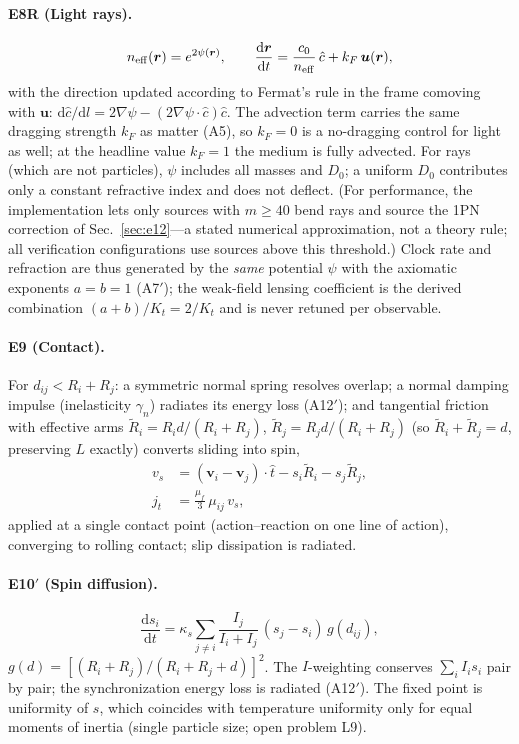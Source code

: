 \documentclass[aps,reprint,amsmath,amssymb,nofootinbib,superscriptaddress,floatfix]{revtex4-2}
\newcommand{\ud}{\mathrm{d}}
\newcommand{\vect}[1]{\bm{#1}}
\newcommand{\Kt}{K_t}
\newcommand{\Dz}{D_0}
\begin{document}
\paragraph*{E8R (Light rays).}
\begin{equation}
n_{\rm eff}(\vect{r}) = e^{2\psi(\vect{r})},\qquad
\frac{\ud\vect{r}}{\ud t}
 = \frac{c_0}{n_{\rm eff}}\,\hat{c} + k_F\,\vect{u}(\vect{r}),
\label{eq:E8}
\end{equation}
with the direction updated according to Fermat's rule in the frame
comoving with
$\vect{u}$:
$\ud\hat{c}/\ud l = 2\nabla\psi - (2\nabla\psi\cdot\hat{c})\hat{c}$.
The advection term carries the same dragging strength $k_F$ as matter
(A5), so $k_F = 0$ is a no-dragging control for light as well; at the
headline value $k_F = 1$ the medium is fully advected.
For rays (which are not particles), $\psi$ includes all masses and
$\Dz$; a uniform $\Dz$ contributes only a constant refractive index and
does not deflect.
(For performance, the implementation lets only sources with
$m \ge 40$ bend rays and source the 1PN correction of
Sec.~\ref{sec:e12}---a stated numerical approximation, not a theory
rule; all verification configurations use sources above this
threshold.)
Clock rate and refraction are thus generated by the \emph{same}
potential $\psi$ with the axiomatic exponents $a = b = 1$ (A7$'$); the
weak-field lensing coefficient is the derived combination
$(a+b)/\Kt = 2/\Kt$ and is never retuned per observable.

\paragraph*{E9 (Contact).}
For $d_{ij} < R_i + R_j$: a symmetric normal spring resolves overlap; a
normal damping impulse (inelasticity $\gamma_n$) radiates its energy
loss (A12$'$); and tangential friction with effective arms
$\tilde R_i = R_i d/(R_i{+}R_j)$, $\tilde R_j = R_j d/(R_i{+}R_j)$
(so $\tilde R_i + \tilde R_j = d$, preserving $L$ exactly) converts
sliding into spin,
\begin{align}
v_s &= (\vect{v}_i-\vect{v}_j)\cdot\hat{t}
 - s_i\tilde R_i - s_j\tilde R_j,\nonumber\\
j_t &= \tfrac{\mu_f}{3}\,\mu_{ij}\,v_s,
\label{eq:E9}
\end{align}
applied at a single contact point (action--reaction on one line of
action), converging to rolling contact; slip dissipation is radiated.

\paragraph*{E10$'$ (Spin diffusion).}
\begin{equation}
\frac{\ud s_i}{\ud t} = \kappa_s\sum_{j\ne i}
 \frac{I_j}{I_i+I_j}\,(s_j-s_i)\,g(d_{ij}),
\label{eq:E10}
\end{equation}
$g(d) = [(R_i{+}R_j)/(R_i{+}R_j{+}d)]^2$.
The $I$-weighting conserves $\sum_i I_i s_i$ pair by pair; the
synchronization energy loss is radiated (A12$'$).
The fixed point is uniformity of $s$, which coincides with temperature
uniformity only for equal moments of inertia (single particle size;
open problem L9).
\end{document}
